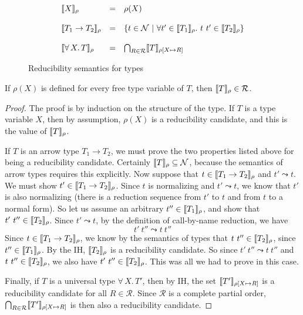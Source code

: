 \documentclass{article}
\begin{document}
\begin{figure}
\[
\begin{array}{lll}
\llbracket X \rrbracket_\rho & = & \rho(X) \\ \\
\llbracket T_1 \to T_2 \rrbracket_\rho & = & \{ t \in \mathcal{N}\ |\ \forall t'\in\llbracket T_1 \rrbracket_\rho.\ t\ t'\in\llbracket T_2 \rrbracket_\rho \} \\ \\
\llbracket \forall\, X.\,T \rrbracket_\rho & = & \bigcap_{R\in\mathcal{R}} \llbracket T \rrbracket_{\rho[X\mapsto R]} 
\end{array}
\]
\caption{Reducibility semantics for types}
\label{fig:semtp}
\end{figure}

\begin{lemma}
\label{lem:semred}
  If $\rho(X)$ is defined for every free type variable of $T$, then
  $\llbracket T \rrbracket_\rho \in \mathcal{R}$.
\end{lemma}
\begin{proof}
  The proof is by induction on the structure of the type.  If $T$ is a
  type variable $X$, then by assumption, $\rho(X)$ is a reducibility
  candidate, and this is the value of $\llbracket T \rrbracket_\rho$.

  If $T$ is an arrow type $T_1 \to T_2$, we must prove the two
  properties listed above for being a reducibility candidate.
  Certainly $\llbracket T \rrbracket_\rho\subseteq\mathcal{N}$, because the
  semantics of arrow types requires this explicitly.  Now suppose that
  $t\in\llbracket T_1\to T_2 \rrbracket_\rho$ and $t'\leadsto t$.  We must show
  $t'\in\llbracket T_1\to T_2 \rrbracket_\rho$.  Since $t$ is normalizing and
  $t'\leadsto t$, we know that $t'$ is also normalizing (there is a
  reduction sequence from $t'$ to $t$ and from $t$ to a normal form).
  So let us assume an arbitrary $t''\in\llbracket T_1 \rrbracket_\rho$, and show
  that $t'\ t''\in\llbracket T_2 \rrbracket_\rho$.  Since $t' \leadsto t$, by the
  definition of call-by-name reduction, we have
\[
t'\ t'' \leadsto t\ t''
\]
Since $t\in\llbracket T_1\to T_2 \rrbracket_\rho$, we know by the semantics of
types that $t\ t''\in\interp{T_2}_\rho$, since
$t''\in\llbracket T_1 \rrbracket_\rho$.  By the IH, $\llbracket T_2 \rrbracket_\rho$ is a
reducibility candidate.  So since $t'\ t''\leadsto t\ t''$ and $t\
t''\in\llbracket T_2 \rrbracket_\rho$, we also have $t'\ t''\in\llbracket T_2 \rrbracket_\rho$.
This was all we had to prove in this case.

Finally, if $T$ is a universal type $\forall\, X.\,T'$, then by IH, the
set $\llbracket T' \rrbracket_{\rho[X\mapsto R]}$ is a reducibility candidate for
all $R\in\mathcal{R}$.  Since $\mathcal{R}$ is a complete partial
order, $\bigcap_{R\in\mathcal{R}}\llbracket T' \rrbracket_{\rho[X\mapsto R]}$ is
then also a reducibility candidate.

\end{proof}
\end{document}
